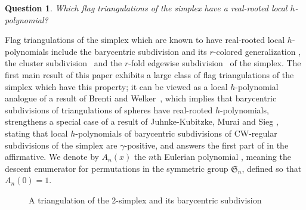 \documentclass[11pt]{amsart}
\newtheorem{question}[theorem]{Question}
\newcommand{\fS}{{\mathfrak S}}
\begin{document}
\begin{question} \label{que:main} 
Which flag triangulations of the simplex have a
real-rooted local $h$-polynomial?
\end{question}

Flag triangulations of the simplex which are known 
to have real-rooted local $h$-polynomials include 
the barycentric subdivision and its $r$-colored
generalization \cite[Section~3.3]{BS21} 
\cite[Section~5.1]{GS20}, the cluster 
subdivision~\cite{Zh18} and the $r$-fold edgewise 
subdivision~\cite{Zh19} of the simplex. The first 
main result of this paper exhibits a large class 
of flag triangulations of the simplex which have 
this property; it can be viewed as a local 
$h$-polynomial analogue of a result of Brenti and 
Welker~\cite{BW08}, which implies that barycentric 
subdivisions of triangulations of spheres have 
real-rooted $h$-polynomials, strengthens a special
case of a result of Juhnke-Kubitzke, Murai and Sieg
\cite{KMS19}, stating that local $h$-polynomials 
of barycentric subdivisions of CW-regular subdivisions 
of the simplex are $\gamma$-positive, and answers the 
first part of \cite[Question~6.3]{Ath22+} in the 
affirmative. We denote by $A_n(x)$ the $n$th
Eulerian polynomial \cite[Section~I.4]{StaEC1},
meaning the descent enumerator for permutations 
in the symmetric group $\fS_n$, defined so that 
$A_n(0) = 1$.

\begin{figure}
\begin{center}
\caption{A triangulation of the 2-simplex and 
its barycentric subdivision}
\end{center}
\end{figure}
\end{document}
